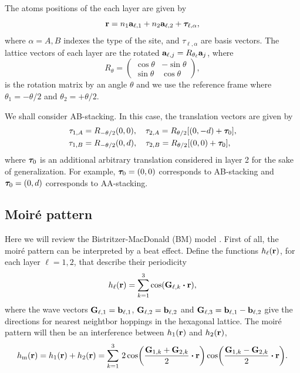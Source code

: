 The atoms positions of the each layer are given by
\begin{equation} \label{eq:position-atoms-tbg}
{\vb{r}} = n_1 {\vb{a}}_{\ell,1} + n_2 {\vb{a}}_{\ell,2} + {\bm{\tau}}_{\ell,\alpha},
\end{equation}
where $\alpha = A,B$ indexes the type of the site, and $\tau_{\ell,\alpha}$ are basis vectors. The lattice vectors of each layer are the rotated ${\vb{a}}_{\ell,j} = R_{\theta_\ell} {\vb{a}}_{j}$, where
\begin{equation} \label{eq:rotation-matrix}
R_\theta =
\begin{pmatrix}
\cos\theta & -\sin\theta \\
\sin\theta & \cos\theta
\end{pmatrix},
\end{equation}
is the rotation matrix by an angle $\theta$ and we use the reference frame where $\theta_1 = -\theta/2$ and $\theta_2 = +\theta/2$.

We shall consider AB-stacking. In this case, the translation vectors are given by
\begin{align}
\tau_{1,A} &= R_{-\theta/2}(0,0), \quad \tau_{2,A} = R_{\theta/2} [(0,-d) + {\bm{\tau}}_0], \label{eq:tauA} \\
\tau_{1,B} &= R_{-\theta/2}(0,d), \quad \tau_{2,B} = R_{\theta/2} [(0,0) + {\bm{\tau}}_0], \label{eq:tauB}
\end{align}
where ${\bm{\tau}}_0$ is an additional arbitrary translation considered in layer 2 for the sake of generalization. For example, ${\bm{\tau}}_0 = (0,0)$ corresponds to AB-stacking and ${\bm{\tau}}_0 = (0, d)$ corresponds to AA-stacking.

\subsection{Moiré pattern}

Here we will review the Bistritzer-MacDonald (BM) model \cite{macdonald2011}. First of all, the moiré pattern can be interpreted by a beat effect. Define the functions $h_\ell({\vb{r}})$, for each layer $\ell = 1, 2$, that describe their periodicity
\begin{equation} \label{eq:beat-functions}
h_\ell(\r) = \sum_{k=1}^{3} \cos(\vb{G}_{\ell,k} \vdot \r),
\end{equation}
where the wave vectors $\vb{G}_{\ell,1} = \vb{b}_{\ell,1}$, $\vb{G}_{\ell,2} = \vb{b}_{\ell,2}$ and $\vb{G}_{\ell,3} = \vb{b}_{\ell,1} - \vb{b}_{\ell,2}$ give the directions for nearest neightbor hoppings in the hexagonal lattice. The moiré pattern will then be an interference between $h_1({\vb{r}})$ and $h_2({\vb{r}})$,
\begin{equation} \label{eq:beat-effect}
h_{\text{m}}(\r) = h_1(\r) + h_2(\r) =
\sum_{k=1}^{3}
\, 2 \cos(\frac{\vb{G}_{1,k}+\vb{G}_{2,k}}{2} \vdot \r) \cos(\frac{\vb{G}_{1,k}-\vb{G}_{2,k}}{2} \vdot \r).
\end{equation}

